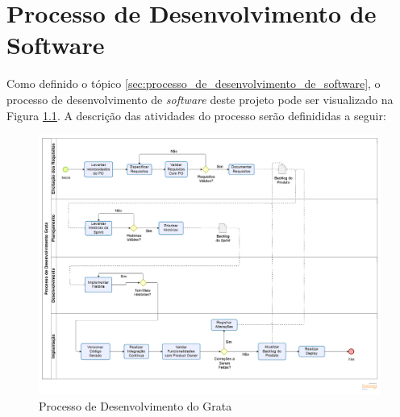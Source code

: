 \chapter[Processo de Desenvolvimento de Software]{Processo de Desenvolvimento de Software}
\label{cp:processo_de_desenvolvimento}

Como definido o tópico \ref{sec:processo_de_desenvolvimento_de_software}, o processo de desenvolvimento de \textit{software} deste projeto pode ser visualizado na Figura \ref{img:processo_de_desenvolvimento}. A descrição das atividades do processo serão definididas a seguir: 

\begin{figure}[H]
	\centering
	\includegraphics[width=1.0\textwidth]{figuras/processo_de_desenvolvimento.png}
	\caption{Processo de Desenvolvimento do Grata}
	\label{img:processo_de_desenvolvimento}
\end{figure}









